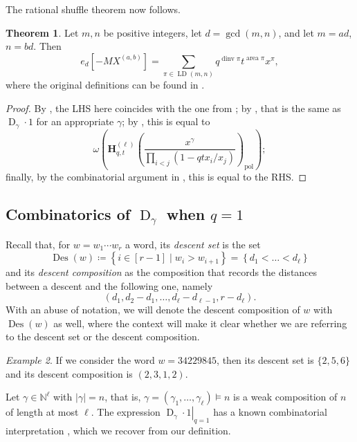 \documentclass[reqno]{amsart}
\theoremstyle{plain}
\theoremstyle{definition}
\newtheorem{theorem}{Theorem}[section]
\theoremstyle{remark}
\newtheorem{example}[theorem]{Example}
\DeclareMathOperator{\D}{D}
\DeclareMathOperator{\LD}{LD}
\DeclareMathOperator{\area}{area}
\DeclareMathOperator{\dinv}{dinv}
\DeclareMathOperator{\Des}{Des}
\newcommand{\<}{\langle}
\renewcommand{\>}{\rangle}
\begin{document}
The rational shuffle theorem now follows.

\begin{theorem}
    Let $m, n$ be positive integers, let $d = \gcd(m,n)$, and let $m = ad$, $n = bd$. Then
    \[ e_d \left[ -MX^{(a,b)} \right] = \sum_{\pi \in \LD(m,n)} q^{\dinv{\pi}} t^{\area{\pi}} x^\pi, \]
    where the original definitions can be found in \cite[Conjecture~4.2]{BergeronGarsiaSergelXin2015CompositionalShuffleConjectures}.
\end{theorem}

\begin{proof}
    By \cite[Remark~3.25]{Mellit2021Rational}, the LHS here coincides with the one from \cite[Conjecture~4.2]{BergeronGarsiaSergelXin2015CompositionalShuffleConjectures}; by , that is the same as $\D_\gamma \cdot 1$ for an appropriate $\gamma$; by , this is equal to
    \[ \omega \left( \mathbf{H}_{q,t}^{(\ell)}\left(\frac{x^\gamma}{\prod_{i<j}(1-qt x_i/x_j)}\right)_{\mathrm{pol}} \right); \]
    finally, by the combinatorial argument in \cite[Theorem~5.5.1]{BHMPS2023ShuffleAnyLine}, this is equal to the RHS.
\end{proof}


\subsection{Combinatorics of \texorpdfstring{$\D_\gamma$}{Dgamma} when \texorpdfstring{$q=1$}{q=1}}

Recall that, for $w = w_1\cdots w_r$ a word, its \emph{descent set} is the set
\[ \Des(w) \coloneqq \left\{ i \in [r-1] \mid w_i>w_{i+1} \right\} = \left\{d_1<\dots<d_\ell\right\} \]
and its \emph{descent composition} as the composition that records the distances between a descent and the following one, namely
\[ \left(d_1,d_2-d_1,\dots,d_\ell-d_{\ell-1},r-d_\ell\right). \]
With an abuse of notation, we will denote the descent composition of $w$ with $\Des(w)$ as well, where the context will make it clear whether we are referring to the descent set or the descent composition.

\begin{example}
    If we consider the word $w=34229845$, then its descent set is $\{2,5,6\}$ and its descent composition is $(2,3,1,2)$.
\end{example}

Let $\gamma \in \mathbb{N}^\ell$ with $\lvert \gamma \rvert = n$, that is, $\gamma = (\gamma_1,\dots,\gamma_\ell) \vDash n$ is a weak composition of $n$ of length at most $\ell$. The expression $\left.\D_\gamma\cdot1\right|_{q=1}$ has a known combinatorial interpretation \cite[Equation~(48)]{BHMPS2023ShuffleAnyLine}, which we recover from our definition.
\end{document}
